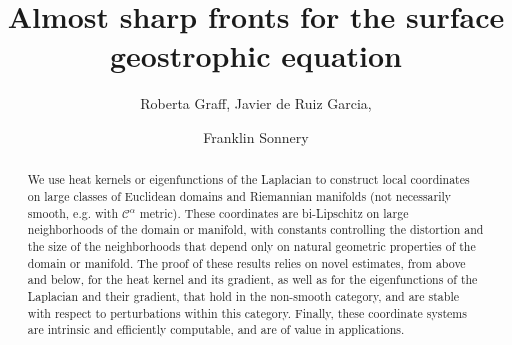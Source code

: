 \documentclass{pnastwo}
\begin{document}
\title{Almost sharp fronts for the surface geostrophic equation}

\author{Roberta Graff,
Javier de Ruiz Garcia,
\and
Franklin Sonnery}


\maketitle

\begin{article}
\begin{abstract}
We use heat kernels or eigenfunctions of the Laplacian to construct
local coordinates on large classes of Euclidean domains and Riemannian
manifolds (not necessarily smooth, e.g. with $\mathcal{C}^\alpha$
metric). These coordinates are bi-Lipschitz on large neighborhoods of
the domain or manifold, with  constants controlling the distortion and
the size of the neighborhoods that depend only on natural geometric
properties of the domain or manifold. The proof of these results relies
on novel estimates, from above and below, for the heat kernel and its
gradient, as well as for the eigenfunctions of the Laplacian and their
gradient, that hold in the non-smooth category, and are stable with
respect to perturbations within this category. Finally, these coordinate
systems are intrinsic and efficiently computable, and are of value in
applications. 
\end{abstract}




\end{article}
\end{document}
